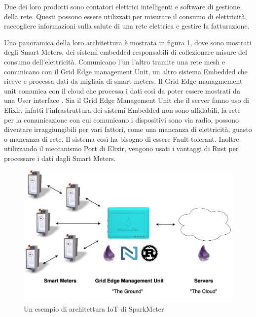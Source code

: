 Due dei loro prodotti sono contatori elettrici
intelligenti e software di gestione della rete.
Questi possono essere utilizzati per misurare
il consumo di elettricità, raccogliere informazioni
sulla salute di una rete elettrica e gestire
la fatturazione.

Una panoramica della loro architettura è mostrata
in figura \ref{fig:architettura_spark}, dove sono
mostrati degli Smart Meters, dei sistemi embedded
responsabili di collezionare misure del consumo
dell'elettricità. Comunicano l'un l'altro tramite
una rete mesh e comunicano con il Grid Edge
management Unit, un altro sistema Embedded che
riceve e processa dati da migliaia di smart meters.
Il Grid Edge managmement unit comunica con il cloud
che processa i dati così da poter essere mostrati
da una User interface \cite{Embedded35:online}.
Sia il Grid Edge Management Unit che il server
fanno uso di Elixir, infatti l'infrastruttura
dei sistemi Embedded non sono affidabili, 
la rete per la comunicazione con cui comunicano i
dispositivi sono via radio,
possono diventare irraggiungibili per vari fattori,
come una mancanza di elettricità, guasto o mancanza di rete.
Il sistema così ha bisogno di essere Fault-tolerant.
Inoltre utilizzando il meccanismo Port di Elixir,
vengono usati i vantaggi di Rust per processare
i dati dagli Smart Meters.

\begin{figure}[!htp]
    \centering
    \includegraphics[keepaspectratio=true,scale=0.33]{images/sparkmeter-new-architecture.png}
	\caption{Un esempio di architettura IoT di SparkMeter\cite{Embedded35:online}}
  	\label{fig:architettura_spark}
\end{figure}



